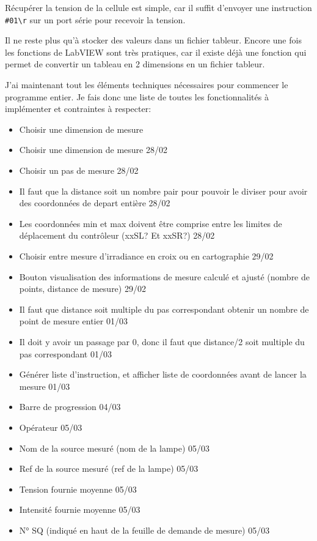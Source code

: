 \documentclass[12pt]{article}
\begin{document}
Récupérer la tension de la cellule est simple, car il suffit d'envoyer une instruction \verb|#01\r| sur un port série pour recevoir la tension.

Il ne reste plus qu'à stocker des valeurs dans un fichier tableur.
Encore une fois les fonctions de LabVIEW sont très pratiques, car il existe déjà une fonction qui permet de convertir un tableau en 2 dimensions en un fichier tableur.

J'ai maintenant tout les éléments techniques nécessaires pour commencer le programme entier.
Je fais donc une liste de toutes les fonctionnalités à implémenter et contraintes à respecter:

\begin{itemize}
	\item [ ] Choisir une dimension de mesure
	\item [ ] Choisir une dimension de mesure  28/02
	\item [ ] Choisir un pas de mesure  28/02
	\item [ ] Il faut que la distance soit un nombre pair pour pouvoir le diviser pour avoir des coordonnées de depart entière  28/02
	\item [ ] Les coordonnées min et max doivent être comprise entre les limites de déplacement du contrôleur (xxSL? Et xxSR?)  28/02
	\item [ ] Choisir entre mesure d'irradiance en croix ou en cartographie 29/02
	\item [ ] Bouton visualisation des informations de mesure calculé et ajusté (nombre de points, distance de mesure)  29/02
	\item [ ] Il faut que distance soit multiple du pas correspondant obtenir un nombre de point de mesure entier  01/03
	\item [ ] Il doit y avoir un passage par 0, donc il faut que distance/2 soit multiple du pas correspondant  01/03
	\item [ ] Générer liste d'instruction, et afficher liste de coordonnées avant de lancer la mesure  01/03
	\item [ ] Barre de progression  04/03
	\item [ ] Opérateur  05/03
	\item [ ] Nom de la source mesuré (nom de la lampe)  05/03
	\item [ ] Ref de la source mesuré (ref de la lampe)  05/03
	\item [ ] Tension fournie moyenne  05/03
	\item [ ] Intensité fournie moyenne  05/03
	\item [ ] N° SQ (indiqué en haut de la feuille de demande de mesure)  05/03

\end{itemize}
\end{document}
